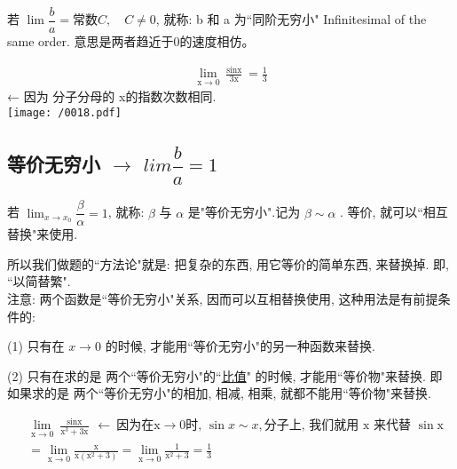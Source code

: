 \documentclass[UTF8]{ctexart}
\begin{document}
若 $\lim \dfrac{b} {a}= \text{常数}C, \quad C \ne 0 $, 就称: b 和 a 为``同阶无穷小" Infinitesimal of the same order. 意思是两者趋近于0的速度相仿。

\begin{myEnvSample}
\begin{align*}  %
	\lim_{\text{x}\rightarrow 0}\frac{\sin\text{x}}{3\text{x}}=\frac{1}{3}  
\end{align*} ← 因为 分子分母的 x的指数次数相同. \\

\texttt{[image: /0018.pdf]}
\end{myEnvSample}






\subsection{等价无穷小 $\to$ $lim \dfrac{b} {a}=1$} 

若 $\lim_{x \rightarrow x_0} \dfrac{\beta} {\alpha} = 1$, 就称: $\beta$ 与 $\alpha$ 是"等价无穷小".记为  $\beta \sim \alpha$ . 等价, 就可以``相互替换"来使用. 

所以我们做题的``方法论"就是: 把复杂的东西, 用它等价的简单东西, 来替换掉. 即, ``以简替繁". \\

注意: 两个函数是``等价无穷小"关系, 因而可以互相替换使用, 这种用法是有前提条件的:

(1) 只有在  $x \to 0$  的时候, 才能用``等价无穷小"的另一种函数来替换.

(2) 只有在求的是 两个``等价无穷小"的``\underline{比值}" 的时候, 才能用``等价物"来替换. 即如果求的是 两个``等价无穷小"的相加, 相减, 相乘, 就都不能用``等价物"来替换. \\

\begin{myEnvSample}
\begin{align*}  %
	&\lim_{\text{x}\rightarrow 0}\frac{\sin\text{x}}{\text{x}^3+3\text{x}}\ \gets \ \text{因为在x}\rightarrow 0\text{时,\ }\sin x \sim x, \text{分子上,\ 我们就用\ x\ 来代替\ }\sin\text{x}\\
	&=\lim_{\text{x}\rightarrow 0}\frac{\text{x}}{\text{x}\left( \text{x}^2+3 \right)}=\lim_{\text{x}\rightarrow 0}\frac{1}{\text{x}^2+3}=\frac{1}{3}
\end{align*}
\end{myEnvSample}
\end{document}
